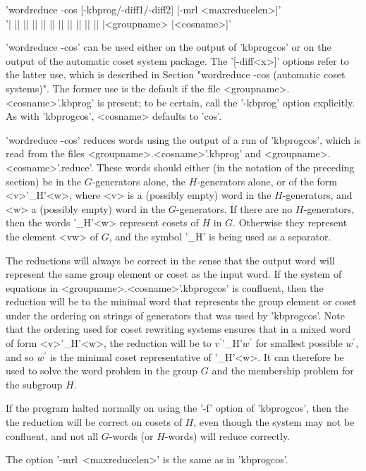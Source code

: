 'wordreduce -cos [-kbprog/-diff1/-diff2] [-mrl <maxreducelen>]'\\ 
'| || || || || || || || || || || |<groupname> [<cosname>]'

'wordreduce -cos' can be used either on the output of 'kbprogcos' or on the
output of the automatic coset system package. The '[-diff<x>]' options refer to
the latter use, which is described in Section
"wordreduce -cos (automatic coset systems)".
The former use is the default if the file <groupname>.<cosname>'.kbprog' is
present; to be certain, call the '-kbprog' option explicitly.
As with 'kbprogcos', <cosname> defaults to 'cos'.

'wordreduce -cos' reduces words using the output of a run of 'kbprogcos',
which is read from the files <groupname>.<cosname>'.kbprog' and
<groupname>.<cosname>'.reduce'.  These words should either (in the notation of
the preceding section) be in the $G$-generators alone, the $H$-generators
alone, or of the form <v>'\_H'<w>, where <v> is a (possibly empty)
word in the $H$-generators, and <w> a (possibly empty) word in the
$G$-generators. If there are no $H$-generators, then the words '\_H'<w>
represent cosets of $H$ in $G$. Otherwise they represent the element
<vw> of $G$, and the symbol '\_H' is being used as a separator.

The reductions will always be correct in the sense that the output word will
represent the same group element or coset as the input word. If the system of
equations in <groupname>.<cosname>'.kbprogcos'
is confluent, then the reduction will be to the minimal word that represents
the group element or coset under the ordering on strings of generators that
was used by 'kbprogcos'. Note that the ordering used for coset rewriting
systems ensures that in a mixed word of form <v>'\_H'<w>, the reduction
will be to $v^\prime$'\_H'$w^\prime$ for smallest possible $w^\prime$, and
so $w^\prime$ is the minimal coset representative of '\_H'<w>.
It can therefore be used to solve the word problem in the group $G$ and
the membership problem for the subgroup $H$.

If the program halted normally on using the '-f' option of 'kbprogcos',
then the the reduction will be correct on cosets of $H$, even though the
system may not be confluent, and not all $G$-words (or $H$-words) will
reduce correctly.

The option '-mrl\ <maxreducelen>' is the same as in 'kbprogcos'.


